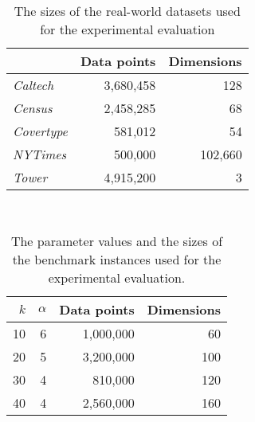 %
\begin{table}
	\begin{center}%
	\caption{The sizes of the real-world datasets used for the experimental evaluation}
	\label{tab:real-world-datasets-overview}
	\begin{tabular}{lrr}
		\toprule
        
		    & Data points
		    & Dimensions
            \\
		\midrule
		\textit{Caltech}
    		& 3,680,458
    		& 128
    		\\
		\textit{Census}
    		& 2,458,285
    		& 68
    		\\
	    \textit{Covertype}
    	    & 581,012
    		& 54
    		\\
	    \textit{NYTimes}
    	    & 500,000
    		& 102,660
    		\\
        \textit{Tower}
            & 4,915,200
    		& 3
    		\\
		\bottomrule
	\end{tabular}\\
	\end{center}
\end{table}



%
\begin{table}
	\begin{center}%
	\caption{The parameter values and the sizes of the benchmark instances used for the experimental evaluation.}
	\label{tab:benchmark-instances-overview}
	\begin{tabular}{rrrr}
		\toprule
        $k$
		    & $\alpha$
		    & Data points
		    & Dimensions
            \\
		\midrule
        10
    		& 6
    		& 1,000,000
    		& 60
    		\\
        20
    		& 5
    		& 3,200,000
    		& 100
    		\\
        30
    		& 4
    		& 810,000
    		& 120
    		\\
        40
    		& 4
    		& 2,560,000
    		& 160
    		\\
		\bottomrule
	\end{tabular}\\
	\end{center}
\end{table}

